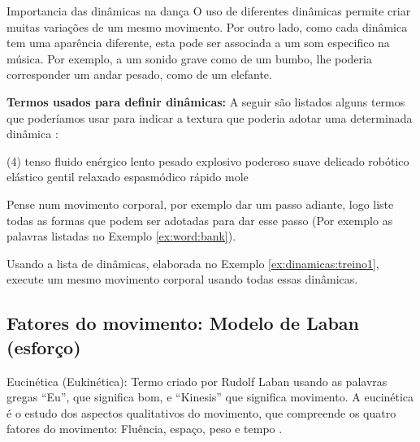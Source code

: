 \begin{tcbinformation}{Importancia das dinâmicas na dança}
\label{ref:importanciadinamicas}
O uso de diferentes dinâmicas permite criar muitas variações de um mesmo movimento.
Por outro lado, como cada dinâmica tem uma aparência diferente,
esta pode ser associada a um som especifico na música.
Por exemplo, a um sonido grave como de um bumbo,
lhe poderia corresponder um andar pesado, como de um elefante.
\end{tcbinformation} 

\begin{example}
\label{ex:word:bank}
\textbf{Termos usados para definir dinâmicas:} 
A seguir são listados alguns termos que poderíamos usar 
para indicar a textura que poderia adotar uma determinada dinâmica \cite[pp. 31]{paine2014complete}:

\begin{tasks}(4)
\task tenso
\task fluido
\task enérgico
\task lento
\task pesado
\task explosivo
\task poderoso
\task suave
\task delicado
\task robótico
\task elástico
\task gentil
\task relaxado
\task espasmódico
\task rápido
\task mole
\end{tasks}
\end{example}


\begin{example}
\label{ex:dinamicas:treino1}
Pense num movimento corporal, por exemplo dar um passo adiante,
logo liste todas as formas que podem ser adotadas para dar esse passo (Por 
exemplo as palavras listadas no Exemplo \ref{ex:word:bank}). 
\end{example}

\begin{example}
\label{ex:dinamicas:treino2}
Usando a lista de dinâmicas, elaborada no Exemplo \ref{ex:dinamicas:treino1},
execute um mesmo movimento corporal usando  todas essas dinâmicas.
\end{example}


\subsection{Fatores do movimento: Modelo de Laban (esforço)}
\label{subsec:fatordinamica}

\begin{tcbinformation}{Eucinética (Eukinética):}
\label{ref:eukinetic}
Termo criado por Rudolf Laban usando as palavras gregas ``Eu'', que significa bom,
e ``Kinesis'' que significa movimento.
A eucinética é o estudo dos aspectos qualitativos do movimento,
que compreende os quatro fatores do movimento: Fluência,  espaço,  peso  e  tempo 
\cite[pp. 25-26]{elementosdanca2017} \cite[pp. 97]{maletic2011body}.
\end{tcbinformation} 


